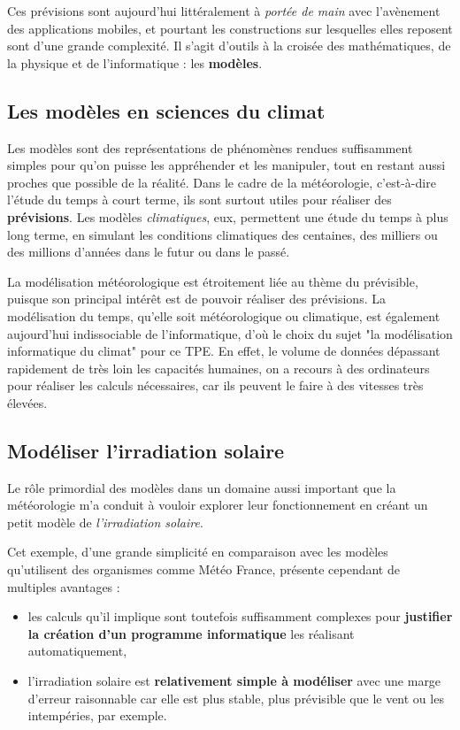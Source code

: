 \documentclass[12pt]{article}
\begin{document}
Ces prévisions sont aujourd'hui littéralement à \emph{portée de main} avec l'avènement des applications mobiles, et pourtant les constructions sur lesquelles elles reposent sont d'une grande complexité.
Il s'agit d'outils à la croisée des mathématiques, de la physique et de l'informatique : les \textbf{modèles}.

\subsection{Les modèles en sciences du climat}
Les modèles sont des représentations de phénomènes rendues suffisamment simples pour qu'on puisse les appréhender et les manipuler, tout en restant aussi proches que possible de la réalité.
Dans le cadre de la météorologie, c'est-à-dire l'étude du temps à court terme, ils sont surtout utiles pour réaliser des \textbf{prévisions}.
Les modèles \emph{climatiques}, eux, permettent une étude du temps à plus long terme, en simulant les conditions climatiques des centaines, des milliers ou des millions d'années dans le futur ou dans le passé.

La modélisation météorologique est étroitement liée au thème du prévisible, puisque son principal intérêt est de pouvoir réaliser des prévisions.
La modélisation du temps, qu'elle soit météorologique ou climatique, est également aujourd'hui indissociable de l'informatique, d'où le choix du sujet "la modélisation informatique du climat" pour ce TPE.
En effet, le volume de données dépassant rapidement de très loin les capacités humaines, on a recours à des ordinateurs pour réaliser les calculs nécessaires, car ils peuvent le faire à des vitesses très élevées.


\subsection{Modéliser l'irradiation solaire}

Le rôle primordial des modèles dans un domaine aussi important que la météorologie m'a conduit à vouloir explorer leur fonctionnement en créant un petit modèle de \emph{l'irradiation solaire}.

Cet exemple, d'une grande simplicité en comparaison avec les modèles qu'utilisent des organismes comme Météo France, présente cependant de multiples avantages :


\begin{itemize}
  \item les calculs qu'il implique sont toutefois suffisamment complexes pour \textbf{justifier la création d'un programme informatique} les réalisant automatiquement,
  \item l'irradiation solaire est \textbf{relativement simple à modéliser} avec une marge d'erreur raisonnable car elle est plus stable, plus prévisible que le vent ou les intempéries, par exemple.
\end{itemize}
\end{document}
